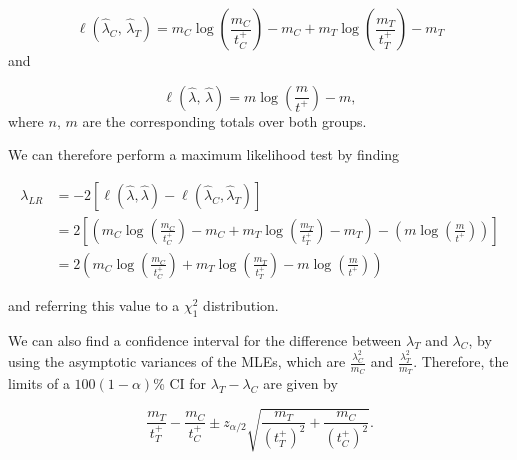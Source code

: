 \documentclass[
  openany]{book}
\theoremstyle{definition}
\theoremstyle{definition}
\theoremstyle{definition}
\theoremstyle{definition}
\theoremstyle{remark}
\begin{document}
\[\ell\left(\hat{\lambda}_C,\,\hat{\lambda}_T\right) = m_C\log\left(\frac{m_C}{t^+_C}\right) - m_C + m_T\log\left(\frac{m_T}{t^+_T}\right) - m_T  \]
and

\[\ell\left(\hat\lambda,\,\hat\lambda\right) = m\log\left(\frac{m}{t^+}\right) - m,\]
where \(n,\,m\) are the corresponding totals over both groups.

We can therefore perform a maximum likelihood test by finding

\begin{align*}
\lambda_{LR}&  = -2\left[\ell\left(\hat{\lambda},\hat{\lambda}\right) - \ell\left(\hat{\lambda}_C,\hat{\lambda}_T\right)\right] \\
& = 2\left[\left(m_C\log\left(\frac{m_C}{t^+_C}\right) - m_C + m_T\log\left(\frac{m_T}{t^+_T}\right) - m_T \right) - \left(m\log\left(\frac{m}{t^+}\right)\right)\right]\\
& = 2\left(m_C\log\left(\frac{m_C}{t^+_C}\right) + m_T\log\left(\frac{m_T}{t^+_T}\right) - m\log\left(\frac{m}{t^+}\right)\right)
\end{align*}

and referring this value to a \(\chi^2_1\) distribution.

We can also find a confidence interval for the difference between \(\lambda_T\) and \(\lambda_C\), by using the asymptotic variances of the MLEs, which are \(\frac{\lambda_C^2}{m_C}\) and \(\frac{\lambda_T^2}{m_T}\). Therefore, the limits of a \(100\left(1-\alpha\right)\)\% CI for \(\lambda_T - \lambda_C\) are given by

\[ \frac{m_T}{t^+_T} - \frac{m_C}{t^+_C} \pm z_{\alpha/2}\sqrt{\frac{m_T}{\left(t^+_T\right)^2} + \frac{m_C}{\left(t^+_C\right)^2}}.\]
\end{document}
